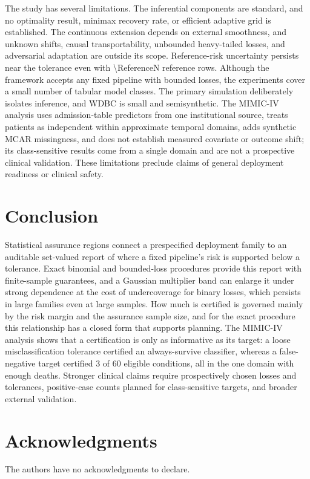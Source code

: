 \documentclass[twoside,11pt]{article}
\begin{document}
The study has several limitations. The inferential components are standard, and no
optimality result, minimax recovery rate, or efficient adaptive grid is established. The
continuous extension depends on external smoothness, and unknown shifts, causal
transportability, unbounded heavy-tailed losses, and adversarial adaptation are outside its
scope. Reference-risk uncertainty persists near the tolerance even with \num{\ReferenceN}
reference rows. Although the framework accepts any fixed pipeline with bounded losses, the
experiments cover a small number of tabular model classes. The primary simulation deliberately
isolates inference, and WDBC is small and semisynthetic. The MIMIC-IV analysis uses
admission-table predictors from one institutional source, treats patients as independent within
approximate temporal domains, adds synthetic MCAR missingness, and does not establish measured
covariate or outcome shift; its class-sensitive results come from a single domain and are not a
prospective clinical validation. These limitations preclude claims of general deployment
readiness or clinical safety.

\section{Conclusion}
Statistical assurance regions connect a prespecified deployment family to an auditable
set-valued report of where a fixed pipeline's risk is supported below a tolerance. Exact
binomial and bounded-loss procedures provide this report with finite-sample guarantees, and a
Gaussian multiplier band can enlarge it under strong dependence at the cost of
undercoverage for binary losses, which persists in large families even at large samples. How
much is certified is governed mainly by the risk margin and the assurance sample size, and for
the exact procedure this relationship has a closed form that supports planning. The MIMIC-IV
analysis shows that a certification is only as informative as its target: a loose
misclassification tolerance certified an always-survive classifier, whereas a false-negative
target certified 3 of 60 eligible conditions, all in the one domain with enough deaths.
Stronger clinical claims require prospectively chosen losses and tolerances, positive-case
counts planned for class-sensitive targets, and broader external validation.

\section*{Acknowledgments}
The authors have no acknowledgments to declare.
\end{document}
